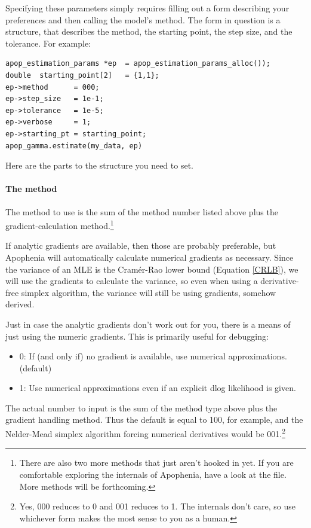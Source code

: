 Specifying these parameters simply requires 
filling out a form describing your preferences and then calling the model's  method.
The form in question is a  structure, that
describes the method, the starting point, the step size, and the
tolerance.
For example:
\begin{lstlisting}
apop_estimation_params *ep  = apop_estimation_params_alloc());
double  starting_point[2]   = {1,1};
ep->method      = 000;
ep->step_size   = 1e-1;
ep->tolerance   = 1e-5;
ep->verbose     = 1;
ep->starting_pt = starting_point;
apop_gamma.estimate(my_data, ep)
\end{lstlisting}

Here are the parts to the  
structure you need to set. 

\paragraph{The method} The method to use is the sum of the method number
listed above plus the gradient-calculation method.\footnote{There are also two more methods that just aren't hooked in yet. If you
are comfortable exploring the internals of Apophenia, have a look at
the  file. More methods will be forthcoming.}

If analytic gradients are available, then those are probably preferable,
but Apophenia will automatically calculate numerical gradients
as necessary.  Since the variance of an MLE is the Cram\'er-Rao lower
bound (Equation \ref{CRLB}), we will use the gradients to calculate
the variance, so even when using a derivative-free simplex algorithm,
the variance will still be using gradients, somehow derived.

Just in case the analytic gradients don't work out for you, there is a
means of just using the numeric gradients. This is primarily useful for debugging:

\begin{itemize}
\item 0: If (and only if) no gradient is available, use numerical approximations.  (default)
\item 1: Use numerical approximations even if an explicit dlog likelihood is given. 
\end{itemize}

The actual number to input is the sum of the method type above plus the
gradient handling method. Thus the default is equal to 100, for example, and the
Nelder-Mead simplex algorithm forcing numerical derivatives would be
001.\footnote{Yes, 000 reduces to 0 and 001 reduces to 1. The internals
don't care, so use whichever form makes the most sense to you as a human.}


